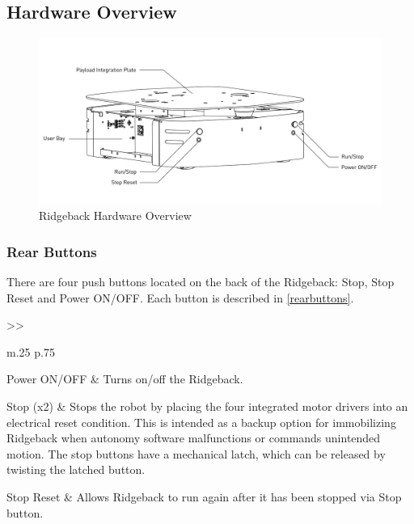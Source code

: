 \documentclass[]{clearpath-latex/clearpath-manual}
\begin{document}
\subsection{Hardware Overview}

\begin{figure}[h]
  \centering
  \includegraphics[width=1\linewidth]{Ridgeback_Rear_Drawing_Labeled.pdf}
  \caption{Ridgeback Hardware Overview}
  \label{ridgeback_overview}
\end{figure}

\subsubsection{Rear Buttons}

There are four push buttons located on the back of the Ridgeback: Stop, Stop Reset and Power ON/OFF.   Each button is described in \autoref{rearbuttons}.

\bgroup
\def\arraystretch{1.2}%
\begin{table}[h]
	\centering
	\begin{tabular}{>{}>{\raggedright}m{.25\textwidth} p{.75\textwidth}} \hline

	Power ON/OFF & Turns on/off the Ridgeback. \\ \hline

	Stop (x2) & Stops the robot by placing the four integrated motor drivers into an electrical reset condition. This is intended as a backup option for immobilizing Ridgeback when autonomy software malfunctions or commands unintended motion. The stop buttons have a mechanical latch, which can be released by twisting the latched button. \\ \hline

	Stop Reset & Allows Ridgeback to run again after it has been stopped via Stop button. \\ \hline

	\end{tabular}
\newline
\caption{Ridgeback Rear Buttons}
\label{rearbuttons}
\end{table}
\egroup
\end{document}
